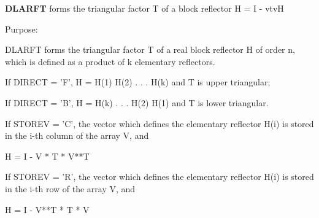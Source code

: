 {\bfseries D\+L\+A\+R\+F\+T} forms the triangular factor T of a block reflector H = I -\/ vtv\+H 

 \begin{DoxyParagraph}{Purpose\+: }
\begin{DoxyVerb} DLARFT forms the triangular factor T of a real block reflector H
 of order n, which is defined as a product of k elementary reflectors.

 If DIRECT = 'F', H = H(1) H(2) . . . H(k) and T is upper triangular;

 If DIRECT = 'B', H = H(k) . . . H(2) H(1) and T is lower triangular.

 If STOREV = 'C', the vector which defines the elementary reflector
 H(i) is stored in the i-th column of the array V, and

    H  =  I - V * T * V**T

 If STOREV = 'R', the vector which defines the elementary reflector
 H(i) is stored in the i-th row of the array V, and

    H  =  I - V**T * T * V\end{DoxyVerb}
 
\end{DoxyParagraph}

